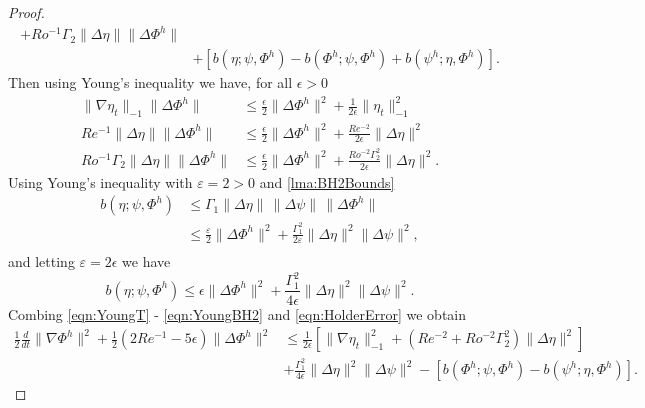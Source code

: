 \begin{proof}
\begin{equation}
\begin{split}
        + Ro^{-1} \Gamma_2 \|\Delta \eta\| \|\Delta \Phi^h\| \\
      & + \left[ b(\eta;\psi,\Phi^h) - b(\Phi^h;\psi,\Phi^h)
        + b(\psi^h;\eta,\Phi^h)\right].
    \end{split}
    \label{eqn:HolderError}
  \end{equation}
  Then using Young's inequality we have, for all $\epsilon>0$
  \begin{align}
    \|\nabla \eta_t\|_{-1} \|\Delta \Phi^h\|
      &\le \frac{\epsilon}{2} \|\Delta \Phi^h\|^2
      + \frac{1}{2 \epsilon} \|\eta_t\|_{-1}^2 \label{eqn:YoungT} \\
    Re^{-1} \|\Delta \eta\| \|\Delta \Phi^h\|
      &\le \frac{\epsilon}{2} \|\Delta \Phi^h\|^2
      + \frac{Re^{-2}}{2 \epsilon} \|\Delta \eta\|^2 \label{eqn:YoungLaplace} \\
    Ro^{-1} \Gamma_2 \|\Delta \eta\| \|\Delta \Phi^h\|
      &\le \frac{\epsilon}{2} \|\Delta \Phi^h\|^2
      + \frac{Ro^{-2} \Gamma_2^2}{2 \epsilon} \|\Delta \eta\|^2. \label{eqn:YoungBeta}
  \end{align}
  Using Young's inequality with $\varepsilon = 2 > 0$ and
  \autoref{lma:BH2Bounds}
  \begin{align*}
    b(\eta;\psi,\Phi^h) &\le \Gamma_1 \|\Delta \eta\|\,\|\Delta \psi\|\, \|\Delta \Phi^h\| \\
    &\le \frac{\varepsilon}{2} \|\Delta \Phi^h\|^2
      + \frac{\Gamma_1^2}{2 \varepsilon} \|\Delta \eta\|^2 \|\Delta \psi\|^2, \\
  \end{align*}
  and letting $\varepsilon = 2 \epsilon$ we have
  \begin{equation}
    b(\eta; \psi, \Phi^h) \le \epsilon \|\Delta \Phi^h\|^2
      + \frac{\Gamma_1^2}{4 \epsilon} \|\Delta \eta\|^2 \|\Delta \psi\|^2.
      \label{eqn:YoungBH2}
  \end{equation}
  Combing \eqref{eqn:YoungT} - \eqref{eqn:YoungBH2} and \eqref{eqn:HolderError}
  we obtain
  \begin{equation}
    \begin{split}
    \frac{1}{2} \frac{d}{dt} \|\nabla \Phi^h\|^2 + \frac{1}{2}\left(2Re^{-1} -
      5 \epsilon \right)\|\Delta \Phi^h\|^2
      &\le \frac{1}{2 \epsilon}\left[\|\nabla \eta_t\|_{-1}^2
      + \left( Re^{-2} + Ro^{-2} \Gamma_2^2 \right) \|\Delta \eta\|^2\right] \\
     & + \frac{\Gamma_1^2}{4 \epsilon}\|\Delta \eta\|^2 \|\Delta \psi\|^2  -
     \left[b(\Phi^h;\psi,\Phi^h) - b(\psi^h;\eta,\Phi^h)\right].

\end{split}
\end{equation}
\end{proof}
